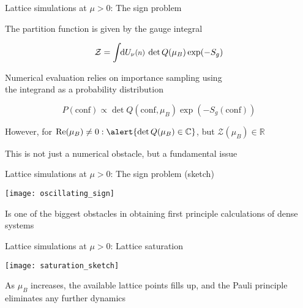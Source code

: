 \begin{frame}{Lattice simulations at \texorpdfstring{$\mu > 0$}{m > 0}: The sign problem}

  The partition function is given by the gauge integral

  \[
    \mathcal{Z} = \int \hspace*{-3pt} \mathrm{d} U_{\nu}\scalemath{0.85}{(n)} \: \det Q (\mu_B) \exp (- S_g )
  \]

  Numerical evaluation relies on \alert{importance sampling} using\\
  the integrand as a probability distribution

  \[
    P(\mathrm{conf}) \propto \det Q (\mathrm{conf}, \mu_B) \exp (-
    S_g(\mathrm{conf}))
  \]

  
  \vspace{.5em}

  However, for $\real(\mu_B) \neq 0: \alert{\det Q(\mu_B) \in \mathbb{C}}$, but
  $\mathcal{Z}(\mu_B) \in \mathbb{R}$

  \vspace{.5em}

  This is not just a numerical obstacle, but a \alert{fundamental issue}
  
\end{frame}

\begin{frame}{Lattice simulations at \texorpdfstring{$\mu > 0$}{m > 0}: The sign problem (sketch)}

  \begin{center}
    \texttt{[image: oscillating\_sign]}
  \end{center}

  \vspace{.5em}

  Is one of the \alert{biggest obstacles} in obtaining first principle calculations of
  dense systems

\end{frame}

\begin{frame}{Lattice simulations at \texorpdfstring{$\mu > 0$}{m > 0}: Lattice saturation}

  \begin{center}
    \texttt{[image: saturation\_sketch]}
  \end{center}

  As $\mu_B$ increases, the available lattice points fills up, and the
  \alert{Pauli principle} eliminates any further dynamics
  
\end{frame}
